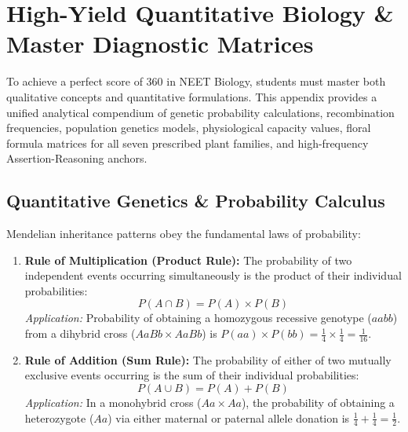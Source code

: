 \documentclass[10pt,twoside,openright]{book}
\begin{document}
\appendix

\chapter{High-Yield Quantitative Biology \& Master Diagnostic Matrices}

To achieve a perfect score of 360 in NEET Biology, students must master both qualitative concepts and quantitative formulations. This appendix provides a unified analytical compendium of genetic probability calculations, recombination frequencies, population genetics models, physiological capacity values, floral formula matrices for all seven prescribed plant families, and high-frequency Assertion-Reasoning anchors.

\section{Quantitative Genetics \& Probability Calculus}

\begin{conceptbox}
Mendelian inheritance patterns obey the fundamental laws of probability:
\begin{enumerate}[leftmargin=*]
  \item \textbf{Rule of Multiplication (Product Rule):} The probability of two independent events occurring simultaneously is the product of their individual probabilities:
  \begin{equation}
    P(A \cap B) = P(A) \times P(B)
  \end{equation}
  \textit{Application:} Probability of obtaining a homozygous recessive genotype ($aabb$) from a dihybrid cross ($AaBb \times AaBb$) is $P(aa) \times P(bb) = \frac{1}{4} \times \frac{1}{4} = \frac{1}{16}$.
  
  \item \textbf{Rule of Addition (Sum Rule):} The probability of either of two mutually exclusive events occurring is the sum of their individual probabilities:
  \begin{equation}
    P(A \cup B) = P(A) + P(B)
  \end{equation}
  \textit{Application:} In a monohybrid cross ($Aa \times Aa$), the probability of obtaining a heterozygote ($Aa$) via either maternal or paternal allele donation is $\frac{1}{4} + \frac{1}{4} = \frac{1}{2}$.
\end{enumerate}
\end{conceptbox}
\end{document}
